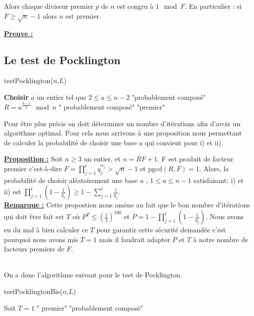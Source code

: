 Alors chaque diviseur premier $p$ de $n$ est congru à $1 \mod F$. En particulier : si $F\geq \sqrt{n}-1$ alors $n$ est premier.

\underline{\textbf{Preuve :}}
 
\subsection{Le test de Pocklington}

\begin{algorithm}[h!]
\caption{testPocklington($n$,$L$)}
\begin{algorithmic}[1]
\State \textbf{Choisir} $a$ un entier tel que $2\leq a \leq n-2$
 \Return "probablement composé" 
\EndIf
{}
\State $R=a^{\frac{n-1}{q}} \mod n$
 \Return " probablement composé" 
\EndIf
\EndFor
\State \Return "premier"
\end{algorithmic}
\end{algorithm}

Pour être plus précis on doit déterminer un nombre d'itérations afin d'avoir un algorithme optimal. Pour cela nous arrivons à une proposition nous permettant de calculer la probabilité de choisir une base $a$ qui convient pour i) et ii).

\underline{\textbf{Proposition :}}
Soit $n \geq 3$ un entier, et $n=RF+1$.  F est produit de facteur premier c’est-à-dire $F=\prod\limits_{j=1}^t q_j^{\alpha_j} > \sqrt{n}-1$  et $\text{pgcd}(R,F)=1$. Alors, la probabilité de choisir aléatoirement une base $a$ , $1\leq a \leq n-1$ satisfaisant: i) et ii) est $\prod\limits_{j=1}^t (1-\frac{1}{q_j}) \geq 1 - \sum\limits_{j=1}^{t} \frac{1}{q_j}  $.
\\
\underline{\textbf{Remarque :}}
Cette propostion nous amène au fait que le bon nombre d'itérations qui doit être fait est $T$ où $P^T \leq (\frac{1}{2})^{100}$ et $P=1-\prod\limits_{j=1}^t (1-\frac{1}{q_j})$. Nous avons eu du mal à bien calculer ce $T$ pour garantir cette sécurité demandée c'est pourquoi nous avons mis $T=1$ mais il faudrait adapter $P$ et $T$ à notre nombre de facteurs premiers de $F$.

\\
On a donc l'algorithme suivant pour le test de Pocklington.

\clearpage

\begin{algorithm}[h!]
\caption{testPocklingtonBis($n$,$L$)}
\begin{algorithmic}[1]
\State Soit $T=1$
 \Return " premier" 
\EndIf
\EndFor
\State \Return "probablement composé"
\end{algorithmic}
\end{algorithm}



